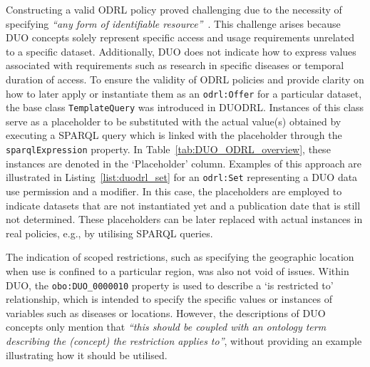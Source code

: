 Constructing a valid ODRL policy proved challenging due to the necessity of specifying \textit{``any form of identifiable resource''}~\citep{iannella_odrl_vocab_2018}.
This challenge arises because DUO concepts solely represent specific access and usage requirements unrelated to a specific dataset.
Additionally, DUO does not indicate how to express values associated with requirements such as research in specific diseases or temporal duration of access.
To ensure the validity of ODRL policies and provide clarity on how to later apply or instantiate them as an \texttt{odrl:Offer} for a particular dataset, the base class \texttt{TemplateQuery} was introduced in DUODRL.
Instances of this class serve as a placeholder to be substituted with the actual value(s) obtained by executing a SPARQL query which is linked with the placeholder through the \texttt{sparqlExpression} property.
In Table~\ref{tab:DUO_ODRL_overview}, these instances are denoted in the `Placeholder' column.
Examples of this approach are illustrated in Listing~\ref{list:duodrl_set} for an \texttt{odrl:Set} representing a DUO data use permission and a modifier.
In this case, the placeholders are employed to indicate datasets that are not instantiated yet and a publication date that is still not determined.
These placeholders can be later replaced with actual instances in real policies, e.g., by utilising SPARQL queries.

The indication of scoped restrictions, such as specifying the geographic location when use is confined to a particular region, was also not void of issues.
Within DUO, the \texttt{obo:DUO\_0000010} property is used to describe a `is restricted to' relationship, which is intended to specify the specific values or instances of variables such as diseases or locations.
However, the descriptions of DUO concepts only mention that \textit{``this should be coupled with an ontology term describing the (concept) the restriction applies to''}, without providing an example illustrating how it should be utilised.

